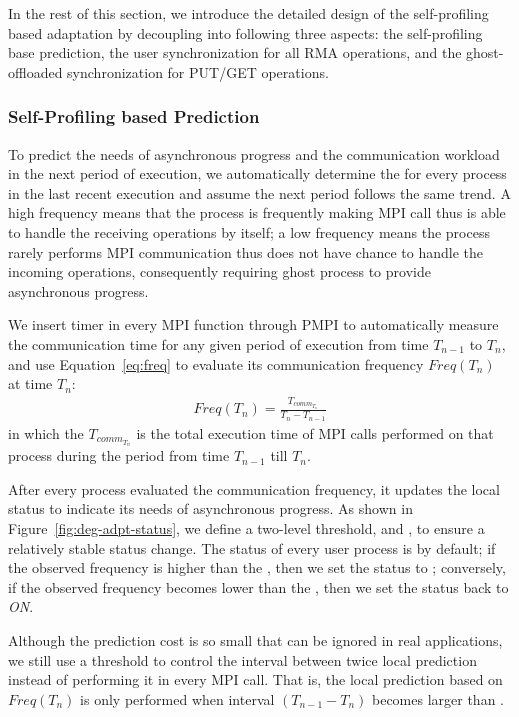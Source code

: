 In the rest of this section, we introduce the detailed design of the
self-profiling based adaptation by decoupling into following three aspects:
the self-profiling base prediction, the user synchronization for all RMA
operations, and the ghost-offloaded synchronization for PUT/GET operations.

\subsubsection{Self-Profiling based Prediction}\label{sec:des-adpt-p-pred}
To predict the needs of asynchronous progress and the communication
workload in the next period of execution, we automatically determine
the  for every process in the last recent
execution and assume the next period follows the same trend. A high
frequency means that the process is frequently making MPI call thus is
able to handle the receiving operations by itself; a low frequency means
the process rarely performs MPI communication thus does not have chance
to handle the incoming operations, consequently requiring ghost
process to provide asynchronous progress.

We insert timer in every MPI function through PMPI to automatically
measure the communication time for any given period of execution
from time $T_{n-1}$ to $T_n$, and use Equation~\ref{eq:freq} to evaluate
its communication frequency $Freq(T_n)$ at time $T_n$:
\begin{align}
Freq(T_n) = \frac{T_{comm_{T_n}}}{T_n - T_{n-1}}
\label{eq:freq}
\end{align}
in which the $T_{comm_{T_n}}$ is the total execution time of MPI calls
performed on that process during the period from time $T_{n-1}$ till
$T_n$.

After every process evaluated the communication frequency, it updates
the local status to indicate its needs of asynchronous progress. As shown
in Figure~\ref{fig:deg-adpt-status}, we define a two-level threshold,
 and , to ensure a relatively stable status
change. The status of every user process is  by default; if
the observed frequency is higher than the , then we set
the status to ; conversely, if the observed frequency becomes
lower than the , then we set the status back to \emph{ON}.

Although the prediction cost is so small that can be ignored
in real applications, we still use a threshold  to
control the interval between twice local prediction instead of performing
it in every MPI call. That is, the local prediction based on $Freq(T_n)$
is only performed when interval $(T_{n-1} - T_n)$ becomes larger than
.

